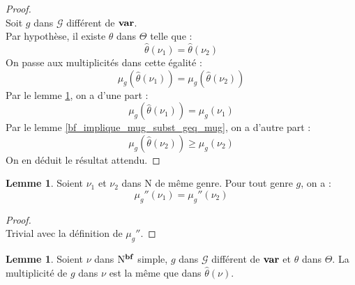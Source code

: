 \documentclass[a4paper]{report}
\newenvironment{preuve} 
  {\begin{proof}~\\} 
  {\end{proof}}
\theoremstyle{definition}
\newtheorem{lemme}[theoreme]{Lemme}
\newcommand{\G}{\mathscr{G}}
\newcommand{\N}{\mathrm{N}}
\begin{document}
\begin{preuve}
  Soit $g$ dans $\G$ différent de $\bold{var}$. \\
  Par hypothèse, il existe $\theta$ dans $\Theta$ telle que :
  \[ \hat\theta (\nu_1) = \hat\theta (\nu_2) \]
  On passe aux multiplicités dans cette égalité :
  \[ \mu_g (\hat\theta (\nu_1)) = \mu_g (\hat\theta (\nu_2)) \]
  Par le lemme \ref{bf_simple_implique_mu_eq_mu_subst}, on a d'une part :
  \[ \mu_g (\hat\theta (\nu_1)) = \mu_g (\nu_1) \]
  Par le lemme \ref{bf_implique_mug_subst_geq_mug}, on a d'autre part :
  \[ \mu_g (\hat\theta (\nu_2)) \geqslant \mu_g (\nu_2) \]
  On en déduit le résultat attendu.
\end{preuve}

\begin{lemme} \label{genre_eq_implique_mug''_eq}
  Soient $\nu_1$ et $\nu_2$ dans $\N$ de même genre. Pour tout genre $g$, on a :
  \[ \mu_g'' (\nu_1) = \mu_g'' (\nu_2) \]
\end{lemme}

\begin{preuve}
  Trivial avec la définition de $\mu_g''$.
\end{preuve}

\begin{lemme} \label{bf_simple_implique_mu_eq_mu_subst}
  Soient $\nu$ dans $\N^{\bold{bf}}$ simple, $g$ dans $\G$ différent de $\bold{var}$ et $\theta$ dans $\Theta$. La multiplicité de $g$ dans $\nu$ est la même que dans $\hat\theta (\nu)$.
\end{lemme}
\end{document}
